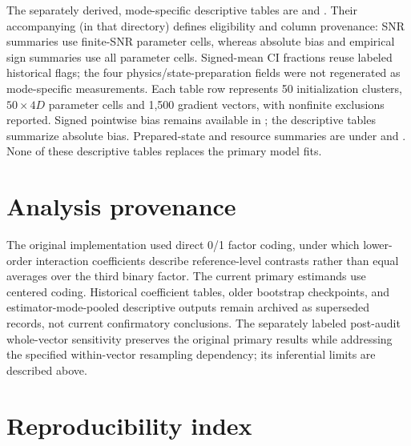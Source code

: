 \documentclass[pdflatex,sn-basic,Numbered]{sn-jnl}
\begin{document}
The separately derived, mode-specific descriptive tables are  and . Their accompanying  (in that directory) defines eligibility and column provenance: SNR summaries use finite-SNR parameter cells, whereas absolute bias and empirical sign summaries use all parameter cells. Signed-mean CI fractions reuse labeled historical flags; the four physics/state-preparation fields were not regenerated as mode-specific measurements. Each table row represents 50 initialization clusters, $50\times4D$ parameter cells and 1,500 gradient vectors, with nonfinite exclusions reported. Signed pointwise bias remains available in ; the descriptive tables summarize absolute bias. Prepared-state and resource summaries are under  and . None of these descriptive tables replaces the primary model fits.

\section{Analysis provenance}

The original implementation used direct 0/1 factor coding, under which lower-order interaction coefficients describe reference-level contrasts rather than equal averages over the third binary factor. The current primary estimands use centered coding. Historical coefficient tables, older bootstrap checkpoints, and estimator-mode-pooled descriptive outputs remain archived as superseded records, not current confirmatory conclusions. The separately labeled post-audit whole-vector sensitivity preserves the original primary results while addressing the specified within-vector resampling dependency; its inferential limits are described above.

\section{Reproducibility index}
\end{document}

